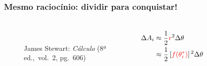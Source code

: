 \documentclass[pdftex, brazil, aspectratio=169]{beamer}
\begin{document}
\setcounter{equation}{6}
\begin{frame}[t]
  \frametitle{Mesmo raciocínio: dividir para conquistar!}
  \begin{columns}
    \centering
  \begin{figure}[H]
    \begin{center}
      \label{fig:int1-27}
      \\
      \footnotesize{James Stewart: \emph{Cálculo} (8ª ed.,\ vol.\ 2, pg.\ 606)}
    \end{center}
  \end{figure}
  \begin{equation}
    \begin{split}
      \Delta A_i &\approx \frac{1}{2}\color{red}r\color{black}^2 \Delta \theta\\
          &\approx \frac{1}{2}\left[\color{red}f(\theta_i^*)\color{black}\right]^2 \Delta \theta
    \end{split}
  \end{equation}
  \centering
  \begin{figure}[H]
      \begin{center}
        \label{fig:int2-28}
        \\

\end{center}
\end{figure}
\end{columns}
\end{frame}
\end{document}
